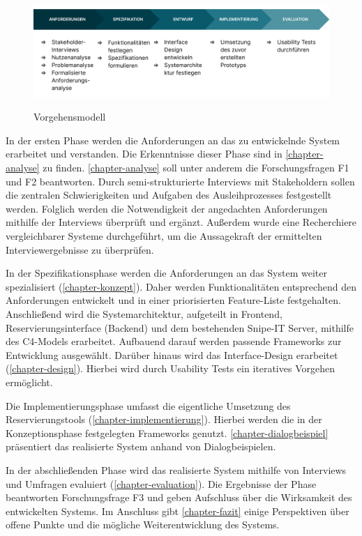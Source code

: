 \begin{figure}[h]
  \centering
  \includegraphics[scale=0.156]{Bilder/vorgehen.png}
  \label{fig:vorgehen}
  \caption[Vorgehensmodell]{Vorgehensmodell}
\end{figure}

In der ersten Phase werden die Anforderungen an das zu entwickelnde System erarbeitet und
verstanden. Die Erkenntnisse dieser Phase sind in \ref{chapter-analyse} zu finden.
\ref{chapter-analyse} soll unter anderem die Forschungsfragen F1 und F2 beantworten. Durch
semi-strukturierte Interviews mit Stakeholdern sollen die zentralen Schwierigkeiten und Aufgaben des
Ausleihprozesses festgestellt werden. Folglich werden die Notwendigkeit der angedachten
Anforderungen mithilfe der Interviews überprüft und ergänzt. Außerdem wurde eine Recherchiere
vergleichbarer Systeme durchgeführt, um die Aussagekraft der ermittelten Interviewergebnisse zu
überprüfen.

In der Spezifikationsphase werden die Anforderungen an das System weiter spezialisiert
(\ref{chapter-konzept}). Daher werden Funktionalitäten entsprechend den Anforderungen entwickelt und
in einer priorisierten Feature-Liste festgehalten. Anschließend wird die Systemarchitektur,
aufgeteilt in Frontend, Reservierungsinterface (Backend) und dem bestehenden Snipe-IT Server,
mithilfe des C4-Models erarbeitet. Aufbauend darauf werden passende Frameworks zur Entwicklung
ausgewählt. Darüber hinaus wird das Interface-Design erarbeitet (\ref{chapter-design}). Hierbei wird
durch Usability Tests ein iteratives Vorgehen ermöglicht.
 

Die Implementierungsphase umfasst die eigentliche Umsetzung des Reservierungstools
(\ref{chapter-implementierung}). Hierbei werden die in der Konzeptionsphase festgelegten Frameworks
genutzt. \ref{chapter-dialogbeispiel} präsentiert das realisierte System anhand von
Dialogbeispielen.

In der abschließenden Phase wird das realisierte System mithilfe von Interviews und Umfragen
evaluiert (\ref{chapter-evaluation}). Die Ergebnisse der Phase beantworten Forschungsfrage F3 und
geben Aufschluss über die Wirksamkeit des entwickelten Systems. Im Anschluss gibt
\ref{chapter-fazit} einige Perspektiven über offene Punkte und die mögliche Weiterentwicklung des
Systems.